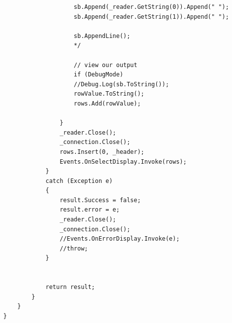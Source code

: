 \begin{verbatim}
						sb.Append(_reader.GetString(0)).Append(" ");
						sb.Append(_reader.GetString(1)).Append(" ");
						
						sb.AppendLine();
						*/
						
						// view our output
						if (DebugMode)
						//Debug.Log(sb.ToString());
						rowValue.ToString();
						rows.Add(rowValue);
						
					}
					_reader.Close();
					_connection.Close();
					rows.Insert(0, _header);
					Events.OnSelectDisplay.Invoke(rows);
				}
				catch (Exception e)
				{
					result.Success = false;
					result.error = e;
					_reader.Close();
					_connection.Close();
					//Events.OnErrorDisplay.Invoke(e);
					//throw;
				}
				
				
				return result;
			}
		}
	}
	
\end{verbatim}